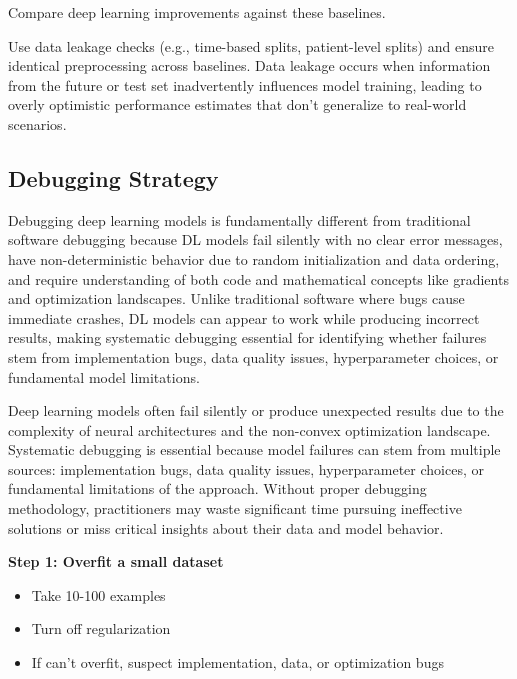Compare deep learning improvements against these baselines. 

\begin{example}
Use data leakage checks (e.g., time-based splits, patient-level splits) and ensure identical preprocessing across baselines. Data leakage occurs when information from the future or test set inadvertently influences model training, leading to overly optimistic performance estimates that don't generalize to real-world scenarios.
\end{example}

\subsection{Debugging Strategy}

\begin{remark}
Debugging deep learning models is fundamentally different from traditional software debugging because DL models fail silently with no clear error messages, have non-deterministic behavior due to random initialization and data ordering, and require understanding of both code and mathematical concepts like gradients and optimization landscapes. Unlike traditional software where bugs cause immediate crashes, DL models can appear to work while producing incorrect results, making systematic debugging essential for identifying whether failures stem from implementation bugs, data quality issues, hyperparameter choices, or fundamental model limitations.
\end{remark}

Deep learning models often fail silently or produce unexpected results due to the complexity of neural architectures and the non-convex optimization landscape. Systematic debugging is essential because model failures can stem from multiple sources: implementation bugs, data quality issues, hyperparameter choices, or fundamental limitations of the approach. Without proper debugging methodology, practitioners may waste significant time pursuing ineffective solutions or miss critical insights about their data and model behavior.


\textbf{Step 1: Overfit a small dataset}
\begin{itemize}
    \item Take 10-100 examples
    \item Turn off regularization
    \item If can't overfit, suspect implementation, data, or optimization bugs
\end{itemize}

